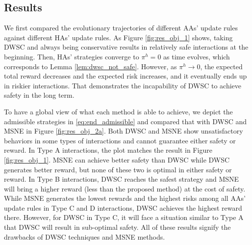 \documentclass[letterpaper]{article} %
\begin{document}
\subsection{Results}
We first compared the evolutionary trajectories of different AAs' update rules against different HAs' update rules. As Figure \ref{fig:res_obj_1} shows, taking DWSC and always being conservative results in relatively safe interactions at the beginning. Then, HAs' strategies converge to $\pi^h=0$ as time evolves, which corresponds to Lemma \ref{lem:dwsc_not_safe}. However, as $\pi^h\rightarrow 0$, the expected total reward decreases and the expected risk increases, and it eventually ends up in riskier interactions. That demonstrates the incapability of DWSC to achieve safety in the long term.

To have a global view of what each method is able to achieve, we depict the admissible strategies in \eqref{eq:end_admissible} and compared that with DWSC and MSNE in Figure \ref{fig:res_obj_2a}.
Both DWSC and MSNE show unsatisfactory behaviors in some types of interactions and cannot guarantee either safety or reward.
In Type A interactions, the plot matches the result in Figure \ref{fig:res_obj_1}. MSNE can achieve better safety than DWSC while DWSC generates better reward, but none of these two is optimal in either safety or reward.
In Type B interactions, DWSC reaches the safest strategy and MSNE will bring a higher reward (less than the proposed method) at the cost of safety.
While MSNE generates the lowest rewards and the highest risks among all AAs' update rules in Type C and D interactions, DWSC achieves the highest reward there.
However, for DWSC in Type C, it will face a situation similar to Type A that DWSC will result in sub-optimal safety.
All of these results signify the drawbacks of DWSC techniques and MSNE methods.
\end{document}
